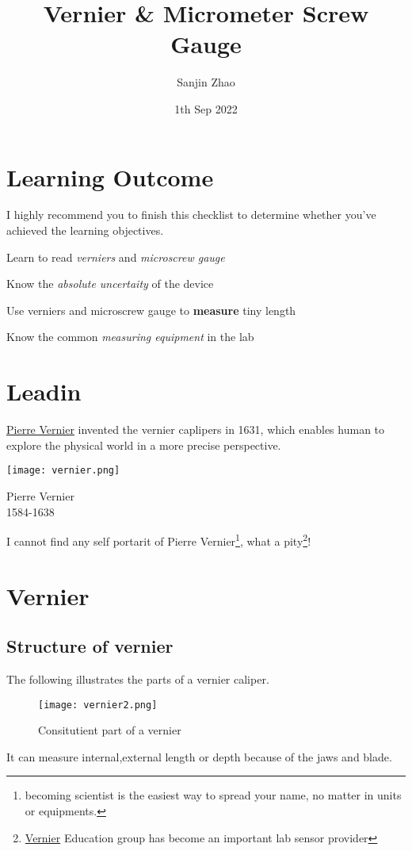 \documentclass[a4paper]{tufte-handout}
\title{Vernier \& Micrometer Screw Gauge}
\author{Sanjin Zhao}
\date{1th Sep 2022}  %
\begin{document}
\maketitle%

\section*{Learning Outcome}
I highly recommend you to finish this checklist to determine whether you've achieved the learning objectives.
\begin{todolist}
	\item Learn to read \emph{verniers} and \emph{microscrew gauge}
	\item Know the \emph{absolute uncertaity} of the device
	\item Use verniers and microscrew gauge to \textbf{measure} tiny length
	\item Know the common \emph{measuring equipment} in the lab
\end{todolist}
\clearpage

\section*{Leadin}
\href{https://www.britannica.com/biography/Pierre-Vernier}{Pierre Vernier} invented the vernier caplipers in 1631, which enables human to explore the physical world in a more precise perspective. 
\begin{marginfigure}
\texttt{[image: vernier.png]}
\caption{Pierre Vernier\\1584-1638}
\end{marginfigure}
I cannot find any self portarit of Pierre Vernier\footnote{becoming scientist is the easiest way to spread your name, no matter in units or equipments.}, what a pity\footnote{\href{https://www.vernier.com/product-category/?category=sensors}{Vernier} Education group has become an important lab sensor provider}!

\section{Vernier}
\subsection{Structure of vernier}
The following illustrates the parts of a vernier caliper.
\begin{figure*}[h]
\texttt{[image: vernier2.png]}
\caption{Consitutient part of a vernier}
\end{figure*}
It can measure internal,external length or depth because of the jaws and blade.
\end{document}
